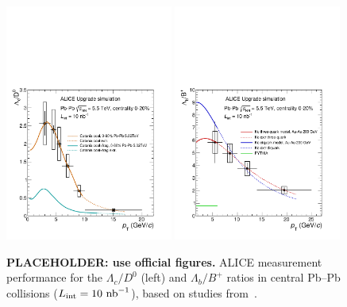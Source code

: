 \begin{figure}[!t]
\centering
\includegraphics[width=0.49\textwidth]{hf/figures/ALICE_LcOverD_YR_tmp.pdf}
\includegraphics[width=0.49\textwidth]{hf/figures/ALICE_LbOverB_YR_tmp.pdf}
\caption{{\bf PLACEHOLDER: use official figures.} ALICE measurement performance for the $\Lambda_c/D^0$ (left) and $\Lambda_b/B^+$ ratios in central Pb--Pb collisions ($L_{\rm int }=10~{\rm nb}^{-1}$), based on studies from~\cite{Abelev:1625842}.}
\label{fig:HFLcLb}
\end {figure}

